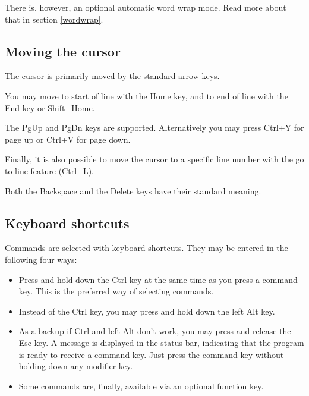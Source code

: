 \documentclass{article}
\begin{document}
        There is, however, an optional automatic 
        word wrap mode. Read more about that in section \ref{wordwrap}.
       
    \subsection{Moving the cursor}

        The cursor is primarily moved by the standard arrow keys.

        You may move to start of line with the Home key, and to end of line with the End key or Shift+Home.

        The PgUp and PgDn keys are supported. Alternatively you may press
        Ctrl+Y for page up or Ctrl+V for page down.

        Finally, it is also possible to move the cursor to a specific line number 
        with the go to line feature (Ctrl+L).

        Both the Backspace and the Delete keys have their standard meaning.

    \subsection{Keyboard shortcuts}
    \label{commands}
    
        Commands are selected with keyboard shortcuts. They may be entered in the following four ways:

        \begin{itemize}

            \item Press and hold down the Ctrl key at the same time as you press a command key. This is the
            preferred way of selecting commands.

            \item Instead of the Ctrl key, you may press and hold down the left Alt key.
            
            \item As a backup if Ctrl and left Alt don't work, you may press and release the Esc key. A message is displayed in the status bar,
            indicating that the program is ready to receive a command key. Just press the command key without holding down any modifier key.
            
            \item Some commands are, finally, available via an optional function key.
        \end{itemize}
\end{document}
